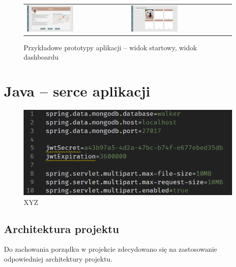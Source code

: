 \begin{figure}[H]
    \centering
      \begin{tabular}{@{}ll@{}}
        \includegraphics[width=0.475\textwidth]{rysunki/Home -walk info.png} & 
        \includegraphics[width=0.475\textwidth]{rysunki/Home - dog list.png}
      \end{tabular}
    \caption{Przykładowe prototypy aplikacji -- widok startowy, widok dashboardu}
    \label{fig:mocks-lists}
\end{figure}

\newpage
\section{Java -- serce aplikacji}
\begin{figure}[H]
  \centering
  \includegraphics[width=1\linewidth]{rysunki/props.PNG}
  \caption{XYZ}
  \label{fig:xyz}
\end{figure}

\subsection{Architektura projektu}
Do zachowania porządku w projekcie zdecydowano się na zastosowanie odpowiedniej architektury projektu.

